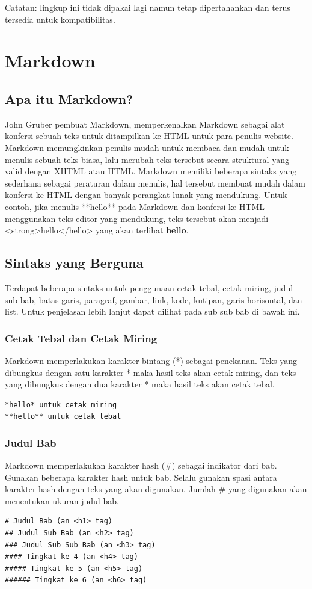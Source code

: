 Catatan: lingkup ini tidak dipakai lagi namun tetap dipertahankan dan terus tersedia untuk kompatibilitas.

\section{Markdown}
\label{sec:markdown}

\subsection{Apa itu Markdown? \cite{Markguide:2015}}
John Gruber pembuat Markdown, memperkenalkan Markdown sebagai alat konfersi sebuah teks untuk ditampilkan ke HTML untuk para penulis website. Markdown memungkinkan penulis mudah untuk membaca dan mudah untuk menulis sebuah teks biasa, lalu merubah teks tersebut secara struktural yang valid dengan XHTML atau HTML.
Markdown memiliki beberapa sintaks yang sederhana sebagai peraturan dalam menulis, hal tersebut membuat mudah dalam konfersi ke HTML dengan banyak perangkat lunak yang mendukung.
Untuk contoh, jika menulis **hello** pada Markdown dan konfersi ke HTML menggunakan teks editor yang mendukung, teks tersebut akan menjadi <strong>hello</hello> yang akan terlihat \textbf{hello}.

\subsection{Sintaks yang Berguna \cite{Markguide:2015}}
Terdapat beberapa sintaks untuk penggunaan cetak tebal, cetak miring, judul sub bab, batas garis, paragraf, gambar, link, kode, kutipan, garis horisontal, dan list. Untuk penjelasan lebih lanjut dapat dilihat pada sub sub bab di bawah ini.

\subsubsection{Cetak Tebal dan Cetak Miring}
Markdown memperlakukan karakter bintang (*) sebagai penekanan. Teks yang dibungkus dengan satu karakter * maka hasil teks akan cetak miring, dan teks yang dibungkus dengan dua karakter * maka hasil teks akan cetak tebal.
\begin{lstlisting}
*hello* untuk cetak miring
**hello** untuk cetak tebal
\end{lstlisting}

\subsubsection{Judul Bab}
Markdown memperlakukan karakter hash (\#) sebagai indikator dari bab. Gunakan beberapa karakter hash untuk bab. Selalu gunakan spasi antara karakter hash dengan teks yang akan digunakan. Jumlah \# yang digunakan akan menentukan ukuran judul bab.
\begin{lstlisting}
# Judul Bab (an <h1> tag)
## Judul Sub Bab (an <h2> tag)
### Judul Sub Sub Bab (an <h3> tag)
#### Tingkat ke 4 (an <h4> tag)
##### Tingkat ke 5 (an <h5> tag)
###### Tingkat ke 6 (an <h6> tag)
\end{lstlisting}

